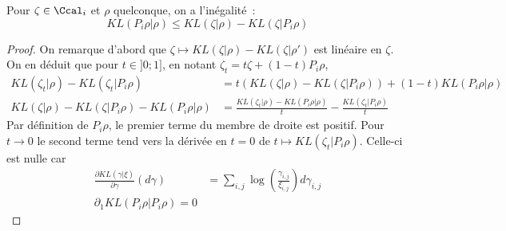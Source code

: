 
\begin{lemma} \label{lemma:kl_ineq}
Pour $\zeta \in \Ccal_i$ et $\rho$ quelconque, on a l'inégalité~:
\[
KL(P_i \rho | \rho ) \le KL(\zeta | \rho) - KL(\zeta | P_i \rho)
\]
\end{lemma}
\begin{proof}
On remarque d'abord que $\zeta \mapsto KL(\zeta | \rho) - KL(\zeta | \rho')$ est linéaire en $\zeta$.
On en déduit que pour $t \in ]0;1]$, en notant $\zeta_t = t \zeta + (1-t) P_i \rho$,
\[\begin{split}
KL(\zeta_t | \rho) - KL(\zeta_t | P_i \rho) &= t (KL(\zeta | \rho) - KL(\zeta | P_i \rho)) + (1-t) KL(P_i \rho | \rho) \\
KL(\zeta | \rho) - KL(\zeta | P_i \rho) - KL(P_i \rho | \rho) &= \frac{KL(\zeta_t | \rho) - KL(P_i \rho | \rho)}{t} - \frac{KL(\zeta_t | P_i \rho) }{t}
\end{split}\]
Par définition de $P_i \rho$, le premier terme du membre de droite est positif. Pour $t \rightarrow 0$ le second terme tend vers la dérivée en $t=0$ de $t \mapsto KL(\zeta_t | P_i \rho)$. Celle-ci est nulle car
\[\begin{split}
\frac{\partial KL(\gamma | \xi)}{\partial \gamma}(d\gamma) &= \sum_{i,j} \log \left(\frac{\gamma_{i,j}}{\xi_{i,j}} \right) d\gamma_{i,j} \\
\partial_1 KL(P_i \rho | P_i \rho) = 0
\end{split}\]
\end{proof}

\begin{lemma}
\end{lemma}